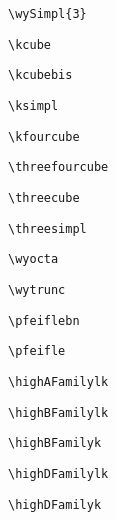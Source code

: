 \documentclass[11pt,a4paper,onecolumn]{article}
\begin{document}
\verb!\wySimpl{3}!	\begin{wythoff}\end{wythoff}

\verb!\kcube!	\kcube

\verb!\kcubebis!	\kcubebis

\verb!\ksimpl!	\ksimpl

\verb!\kfourcube! \kfourcube

\verb!\threefourcube! \threefourcube

\verb!\threecube! \threecube

\verb!\threesimpl! \threesimpl

\verb!\wyocta! \wyocta

\verb!\wytrunc! \wytrunc

\verb!\pfeiflebn! \pfeiflebn
  

\verb!\pfeifle! \pfeifle

\verb!\highAFamilylk! \highAFamilylk

\verb!\highBFamilylk! \highBFamilylk

\verb!\highBFamilyk! \highBFamilyk

\verb!\highDFamilylk! \highDFamilylk

\verb!\highDFamilyk! \highDFamilyk
\end{document}

